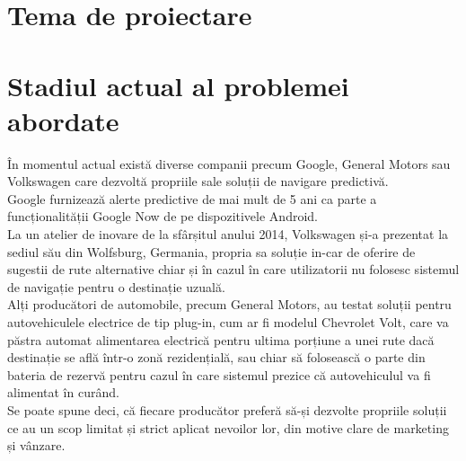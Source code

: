 \label{cap1}


\label{Chapter1} %

\thispagestyle{fancy}

 
\section{Tema de proiectare} 

\section{Stadiul actual al problemei abordate} 
În momentul actual există diverse companii precum Google, General Motors sau Volkswagen care dezvoltă propriile sale soluții de navigare predictivă.
\vspace{6pt}
\\Google furnizează alerte predictive de mai mult de 5 ani ca parte a funcționalității Google Now de pe dispozitivele Android.
\vspace{6pt}
\\La un atelier de inovare de la sfârșitul anului 2014, Volkswagen și-a prezentat la sediul său din Wolfsburg, Germania, propria sa soluție in-car de oferire de sugestii de rute alternative chiar și în cazul în care utilizatorii nu folosesc sistemul de navigație pentru o destinație uzuală. 
\vspace{6pt}
\\Alți producători de automobile, precum General Motors, au testat soluții pentru autovehiculele electrice de tip plug-in, cum ar fi modelul Chevrolet Volt, care va păstra automat alimentarea electrică pentru ultima porțiune a unei rute dacă destinație se află într-o zonă rezidențială, sau chiar să folosească o parte din bateria de rezervă pentru cazul în care sistemul prezice că autovehiculul va fi alimentat în curând.
\vspace{6pt}
\\Se poate spune deci, că fiecare producător preferă să-și dezvolte propriile soluții ce au un scop limitat și strict aplicat nevoilor lor, din motive clare de marketing și vânzare.

